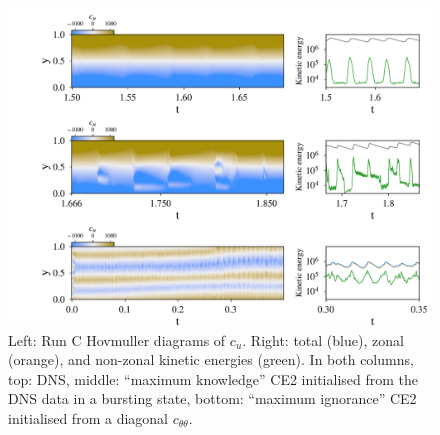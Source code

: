 \documentclass{jfm}
\newcommand{\cu}{c_u}
\newcommand{\ctt}{c_{\theta \theta}}
\begin{document}
\begin{figure}
  \centering
  \includegraphics[width=\textwidth]{../../figs/run_C_fig.pdf}
  \caption{ Left: Run C Hovmuller diagrams of $\cu$. Right: total (blue), zonal (orange), and non-zonal kinetic energies (green). In both columns, top: DNS, middle: ``maximum knowledge'' CE2 initialised from the DNS data in a bursting state, bottom: ``maximum ignorance'' CE2 initialised from a diagonal $\ctt$.}
  \label{fig:run_C}
\end{figure}
\end{document}
